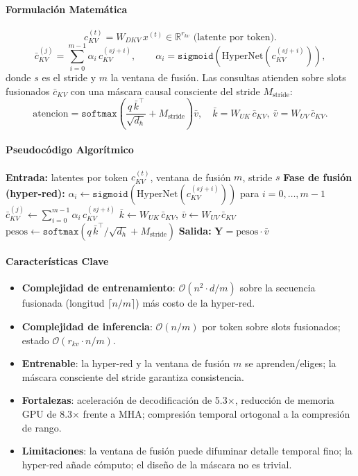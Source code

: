 \paragraph{Formulación Matemática}
\[
c_{KV}^{(t)} = W_{DKV}\, x^{(t)} \in \mathbb{R}^{r_{kv}} \text{ (latente por token)}.
\]
\[
\bar c_{KV}^{(j)} = \sum_{i=0}^{m-1} \alpha_i\, c_{KV}^{(s j + i)}, \qquad \alpha_i = \texttt{sigmoid}(\text{HyperNet}(c_{KV}^{(s j + i)})),
\]
donde $s$ es el stride y $m$ la ventana de fusión. Las consultas atienden sobre slots fusionados $\bar c_{KV}$ con una máscara causal consciente del stride $M_{\text{stride}}$:
\[
\text{atencion} = \texttt{softmax}\!\left(\frac{q\, \bar k^\top}{\sqrt{d_h}} + M_{\text{stride}}\right) \bar v, \quad \bar k = W_{UK}\, \bar c_{KV},\ \bar v = W_{UV}\, \bar c_{KV}.
\]

\paragraph{Pseudocódigo Algorítmico}
\begin{algorithmic}[1]
\State \textbf{Entrada:} latentes por token $c_{KV}^{(t)}$, ventana de fusión $m$, stride $s$
\State \textbf{Fase de fusión (hyper-red):}
    \State $\alpha_i \gets \texttt{sigmoid}(\text{HyperNet}(c_{KV}^{(s j + i)}))$ para $i = 0, \ldots, m-1$
    \State $\bar c_{KV}^{(j)} \gets \sum_{i=0}^{m-1} \alpha_i\, c_{KV}^{(s j + i)}$ 
\EndFor
\State $\bar k \gets W_{UK}\, \bar c_{KV}$, \quad $\bar v \gets W_{UV}\, \bar c_{KV}$
\State $\text{pesos} \gets \texttt{softmax}(q\, \bar k^\top / \sqrt{d_h} + M_{\text{stride}})$ 
\State \textbf{Salida:} $\mathbf{Y} = \text{pesos} \cdot \bar v$
\end{algorithmic}

\paragraph{Características Clave}
\begin{itemize}[leftmargin=*]
    \item \textbf{Complejidad de entrenamiento}: $\mathcal{O}(n^2 \cdot d / m)$ sobre la secuencia fusionada (longitud $\lceil n/m \rceil$) más costo de la hyper-red.
    \item \textbf{Complejidad de inferencia}: $\mathcal{O}(n/m)$ por token sobre slots fusionados; estado $\mathcal{O}(r_{kv} \cdot n / m)$.
    \item \textbf{Entrenable}: la hyper-red y la ventana de fusión $m$ se aprenden/eliges; la máscara consciente del stride garantiza consistencia.
    \item \textbf{Fortalezas}: aceleración de decodificación de 5.3$\times$, reducción de memoria GPU de 8.3$\times$ frente a MHA; compresión temporal ortogonal a la compresión de rango.
    \item \textbf{Limitaciones}: la ventana de fusión puede difuminar detalle temporal fino; la hyper-red añade cómputo; el diseño de la máscara no es trivial.
\end{itemize}

